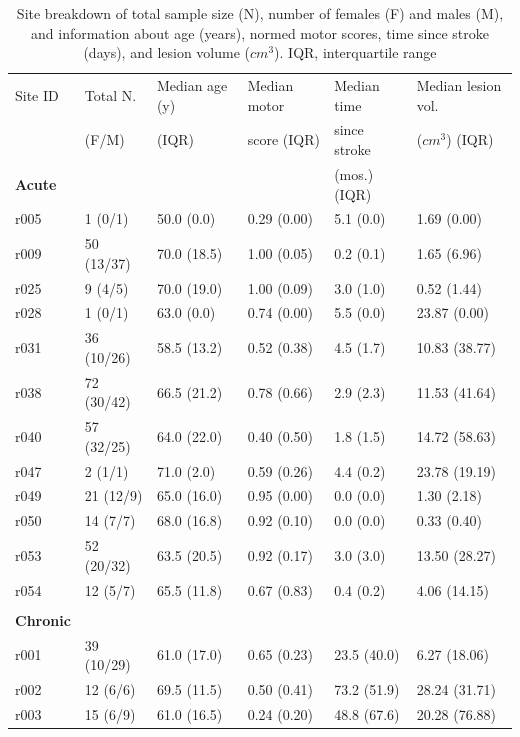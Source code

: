 \documentclass[10pt]{article}
\begin{document}
\begin{table}[h]
\centering
\caption{Site breakdown of total sample size (N), number of females (F) and males (M), and information about age (years), normed motor scores, time since stroke (days), and lesion volume ($cm^3$). IQR, interquartile range}
\label{table:Demographics}
\begin{tabular}{llllll}
\toprule
Site ID & Total N. & Median age (y) & Median motor  & Median time    & Median lesion vol. \\
& (F/M) & (IQR) & score (IQR) &  since stroke  & ($cm^3$) (IQR) \\
 \textbf{Acute}  & & & & (mos.) (IQR) & \\
\arrayrulecolor{black!30}\midrule
r005 & 1 (0/1) & 50.0 (0.0) & 0.29 (0.00) & 5.1 (0.0) & 1.69 (0.00) \\
r009 & 50 (13/37) & 70.0 (18.5) & 1.00 (0.05) & 0.2 (0.1) & 1.65 (6.96) \\
r025 & 9 (4/5) & 70.0 (19.0) & 1.00 (0.09) & 3.0 (1.0) & 0.52 (1.44) \\
r028 & 1 (0/1) & 63.0 (0.0) & 0.74 (0.00) & 5.5 (0.0) & 23.87 (0.00) \\
r031 & 36 (10/26) & 58.5 (13.2) & 0.52 (0.38) & 4.5 (1.7) & 10.83 (38.77) \\
r038 & 72 (30/42) & 66.5 (21.2) & 0.78 (0.66) & 2.9 (2.3) & 11.53 (41.64) \\
r040 & 57 (32/25) & 64.0 (22.0) & 0.40 (0.50) & 1.8 (1.5) & 14.72 (58.63) \\
r047 & 2 (1/1) & 71.0 (2.0) & 0.59 (0.26) & 4.4 (0.2) & 23.78 (19.19) \\
r049 & 21 (12/9) & 65.0 (16.0) & 0.95 (0.00) & 0.0 (0.0) & 1.30 (2.18) \\
r050 & 14 (7/7) & 68.0 (16.8) & 0.92 (0.10) & 0.0 (0.0) & 0.33 (0.40) \\
r053 & 52 (20/32) & 63.5 (20.5) & 0.92 (0.17) & 3.0 (3.0) & 13.50 (28.27) \\
r054 & 12 (5/7) & 65.5 (11.8) & 0.67 (0.83) & 0.4 (0.2) & 4.06 (14.15) \\
 & & & & &\\
\textbf{Chronic}  & & & & &\\
\arrayrulecolor{black!30}\midrule
r001 & 39 (10/29) & 61.0 (17.0) & 0.65 (0.23) & 23.5 (40.0) & 6.27 (18.06) \\
r002 & 12 (6/6) & 69.5 (11.5) & 0.50 (0.41) & 73.2 (51.9) & 28.24 (31.71) \\
r003 & 15 (6/9) & 61.0 (16.5) & 0.24 (0.20) & 48.8 (67.6) & 20.28 (76.88) \\

\end{tabular}
\end{table}
\end{document}
